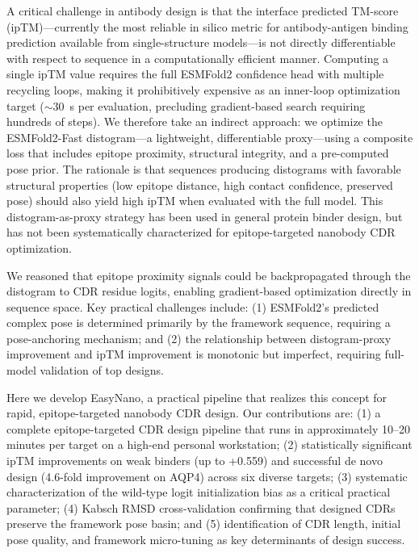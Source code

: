 \documentclass[11pt,a4paper]{article}
\begin{document}
A critical challenge in antibody design is that the interface predicted TM-score (ipTM)---currently the most reliable in silico metric for antibody-antigen binding prediction available from single-structure models\cite{lin2023,abramson2024}---is not directly differentiable with respect to sequence in a computationally efficient manner. Computing a single ipTM value requires the full ESMFold2 confidence head with multiple recycling loops, making it prohibitively expensive as an inner-loop optimization target ($\sim$\SI{30}{\second} per evaluation, precluding gradient-based search requiring hundreds of steps). We therefore take an indirect approach: we optimize the ESMFold2-Fast distogram---a lightweight, differentiable proxy---using a composite loss that includes epitope proximity, structural integrity, and a pre-computed pose prior. The rationale is that sequences producing distograms with favorable structural properties (low epitope distance, high contact confidence, preserved pose) should also yield high ipTM when evaluated with the full model. This distogram-as-proxy strategy has been used in general protein binder design\cite{lin2023}, but has not been systematically characterized for epitope-targeted nanobody CDR optimization.

We reasoned that epitope proximity signals could be backpropagated through the distogram to CDR residue logits, enabling gradient-based optimization directly in sequence space. Key practical challenges include: (1) ESMFold2's predicted complex pose is determined primarily by the framework sequence\cite{hu2026esmfold2}, requiring a pose-anchoring mechanism; and (2) the relationship between distogram-proxy improvement and ipTM improvement is monotonic but imperfect, requiring full-model validation of top designs.

Here we develop EasyNano, a practical pipeline that realizes this concept for rapid, epitope-targeted nanobody CDR design. Our contributions are: (1) a complete epitope-targeted CDR design pipeline that runs in approximately 10--20 minutes per target on a high-end personal workstation; (2) statistically significant ipTM improvements on weak binders (up to +\num{0.559}) and successful de novo design (4.6-fold improvement on AQP4) across six diverse targets; (3) systematic characterization of the wild-type logit initialization bias as a critical practical parameter; (4) Kabsch RMSD cross-validation confirming that designed CDRs preserve the framework pose basin; and (5) identification of CDR length, initial pose quality, and framework micro-tuning as key determinants of design success.
\end{document}
